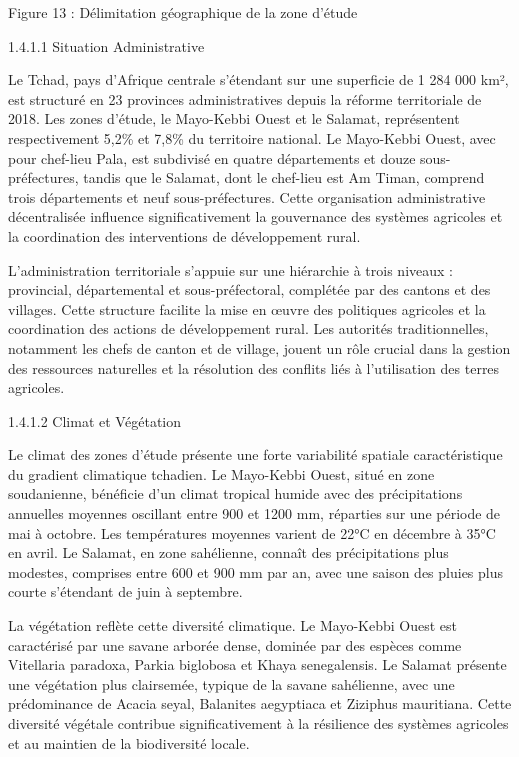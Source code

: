 \documentclass[12pt,oneside]{report}
\begin{document}
Figure 13 : Délimitation  géographique de la zone d’étude

1.4.1.1 Situation Administrative

Le Tchad, pays d'Afrique centrale s'étendant sur une superficie de 1 284 000 km², est structuré en 23 provinces administratives depuis la réforme territoriale de 2018. Les zones d'étude, le Mayo-Kebbi Ouest et le Salamat, représentent respectivement 5,2\% et 7,8\% du territoire national. Le Mayo-Kebbi Ouest, avec pour chef-lieu Pala, est subdivisé en quatre départements et douze sous-préfectures, tandis que le Salamat, dont le chef-lieu est Am Timan, comprend trois départements et neuf sous-préfectures. Cette organisation administrative décentralisée influence significativement la gouvernance des systèmes agricoles et la coordination des interventions de développement rural.

L'administration territoriale s'appuie sur une hiérarchie à trois niveaux : provincial, départemental et sous-préfectoral, complétée par des cantons et des villages. Cette structure facilite la mise en œuvre des politiques agricoles et la coordination des actions de développement rural. Les autorités traditionnelles, notamment les chefs de canton et de village, jouent un rôle crucial dans la gestion des ressources naturelles et la résolution des conflits liés à l'utilisation des terres agricoles.

1.4.1.2 Climat et Végétation

Le climat des zones d'étude présente une forte variabilité spatiale caractéristique du gradient climatique tchadien. Le Mayo-Kebbi Ouest, situé en zone soudanienne, bénéficie d'un climat tropical humide avec des précipitations annuelles moyennes oscillant entre 900 et 1200 mm, réparties sur une période de mai à octobre. Les températures moyennes varient de 22°C en décembre à 35°C en avril. Le Salamat, en zone sahélienne, connaît des précipitations plus modestes, comprises entre 600 et 900 mm par an, avec une saison des pluies plus courte s'étendant de juin à septembre.

La végétation reflète cette diversité climatique. Le Mayo-Kebbi Ouest est caractérisé par une savane arborée dense, dominée par des espèces comme Vitellaria paradoxa, Parkia biglobosa et Khaya senegalensis. Le Salamat présente une végétation plus clairsemée, typique de la savane sahélienne, avec une prédominance de Acacia seyal, Balanites aegyptiaca et Ziziphus mauritiana. Cette diversité végétale contribue significativement à la résilience des systèmes agricoles et au maintien de la biodiversité locale.
\end{document}
